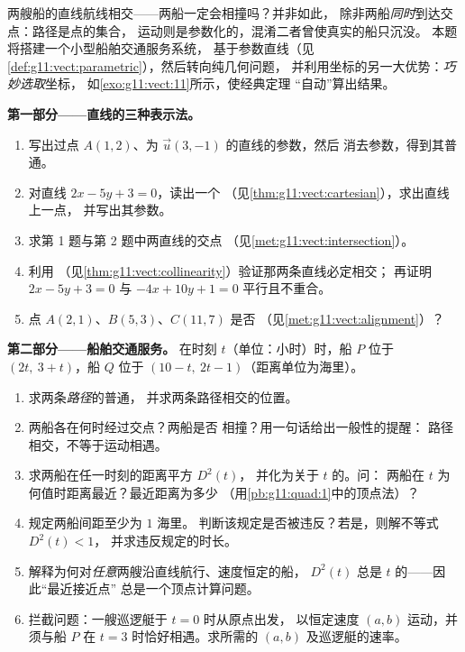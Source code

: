 \begin{problem}
\label{pb:g11:vect:1}
两艘船的直线航线相交——两船一定会相撞吗？并非如此，
除非两船\emph{同时}到达交点：路径是点的集合，
运动则是参数化的，混淆二者曾使真实的船只沉没。
本题将搭建一个小型船舶交通服务系统，
基于参数直线（见\cref{def:g11:vect:parametric}），然后转向纯几何问题，
并利用坐标的另一大优势：\emph{巧妙选取}坐标，
如\cref{exo:g11:vect:11}所示，使经典定理
“自动”算出结果。

\medskip
\noindent\textbf{第一部分——直线的三种表示法。}
\begin{enumerate}
  \item 写出过点
        $A(1, 2)$、为 $\vec u(3, -1)$ 的直线的参数，然后
        消去参数，得到其普通。
  \item 对直线 $2x - 5y + 3 = 0$，读出一个
        （见\cref{thm:g11:vect:cartesian}），求出直线上一点，
        并写出其参数。
  \item 求第 1 题与第 2 题中两直线的交点
        （见\cref{met:g11:vect:intersection}）。
  \item 利用
        （见\cref{thm:g11:vect:collinearity}）验证那两条直线必定相交；
        再证明 $2x - 5y + 3 = 0$ 与
        $-4x + 10y + 1 = 0$ 平行且不重合。
  \item 点 $A(2, 1)$、$B(5, 3)$、$C(11, 7)$ 是否
        （见\cref{met:g11:vect:alignment}）？
\end{enumerate}

\medskip
\noindent\textbf{第二部分——船舶交通服务。}
在时刻 $t$（单位：小时）时，船 $P$ 位于 $(2t,\ 3 + t)$，船 $Q$
位于 $(10 - t,\ 2t - 1)$（距离单位为海里）。
\begin{enumerate}[resume]
  \item 求两条\emph{路径}的普通，
        并求两条路径相交的位置。
  \item 两船各在何时经过交点？两船是否
        相撞？用一句话给出一般性的提醒：
        路径相交，不等于运动相遇。
  \item 求两船在任一时刻的距离平方 $D^2(t)$，
        并化为关于 $t$ 的。问：
        两船在 $t$ 为何值时距离最近？最近距离为多少
        （用\cref{pb:g11:quad:1}中的顶点法）？
  \item 规定两船间距至少为 $1$ 海里。
        判断该规定是否被违反？若是，则解不等式 $D^2(t) < 1$，
        并求违反规定的时长。
  \item 解释为何对\emph{任意}两艘沿直线航行、速度恒定的船，
        $D^2(t)$ 总是
        $t$ 的——因此“最近接近点”
        总是一个顶点计算问题。
  \item 拦截问题：一艘巡逻艇于 $t = 0$ 时从原点出发，
        以恒定速度 $(a, b)$ 运动，并须与船 $P$
        在 $t = 3$ 时恰好相遇。求所需的
        $(a, b)$ 及巡逻艇的速率。
\end{enumerate}


\end{problem}
